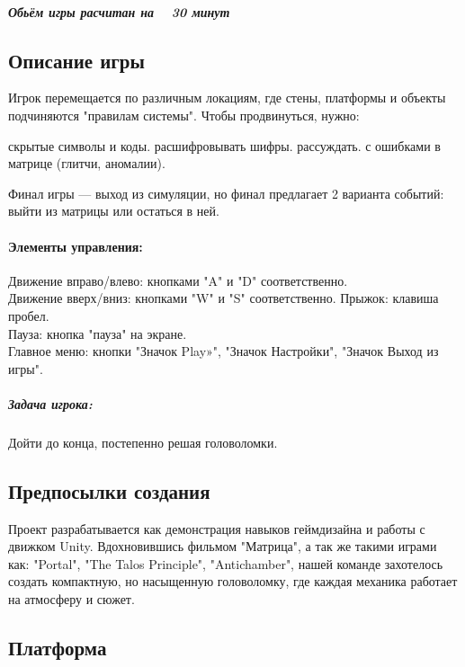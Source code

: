 \documentclass{article}
\begin{document}
\subparagraph{Обьём игры расчитан на ~ 30 минут}

\subsection{Описание игры}
Игрок перемещается по различным локациям, где стены, платформы и объекты подчиняются "правилам системы". Чтобы продвинуться, нужно:
\begin{enumerate}
 скрытые символы и коды.
 расшифровывать шифры.
 рассуждать.
 с ошибками в матрице (глитчи, аномалии).
\end{enumerate}
Финал игры — выход из симуляции, но финал предлагает 2 варианта событий: выйти из матрицы или остаться в ней.
\paragraph{Элементы управления:}
Движение вправо/влево: кнопками "A" и "D" соответственно.\\
Движение вверх/вниз: кнопками "W" и "S" соответственно.
  Прыжок: клавиша пробел.\\
    Пауза: кнопка "пауза" на экране.\\
      Главное меню: кнопки "Значок Play»", "Значок Настройки", "Значок Выход из игры".

\subparagraph{Задача игрока:} Дойти до конца, постепенно решая головоломки.

\subsection{Предпосылки создания}
Проект разрабатывается как демонстрация навыков геймдизайна и работы с движком Unity. Вдохновившись фильмом "Матрица", а так же такими играми как:  "Portal", "The Talos Principle", "Antichamber", нашей команде захотелось создать компактную, но насыщенную головоломку, где каждая механика работает на атмосферу и сюжет.

\subsection{Платформа}
\end{document}
